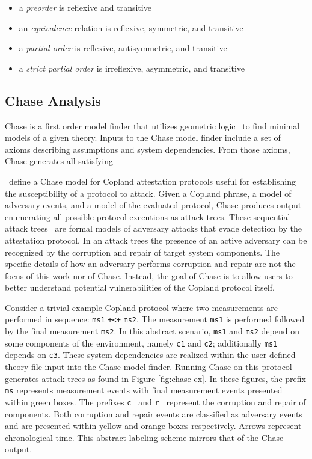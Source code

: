 \documentclass[runningheads]{llncs}
\theoremstyle{definition}
\newcommand{\squash}{\itemsep=0pt\parskip=0pt}
\begin{document}
\begin{itemize}
  \squash
\item a \emph{preorder} is reflexive and transitive
\item an \emph{equivalence} relation is reflexive, symmetric, and transitive 
\item a \emph{partial order} is reflexive, antisymmetric, and transitive 
\item a \emph{strict partial order} is irreflexive, asymmetric, and transitive 
\end{itemize}

\subsection*{Chase Analysis}

Chase \citep{Ramsdell:2020:Chase,Rowe:2021:AutomatedTrust} is a first
order model finder that utilizes geometric
logic~\citep{Enderton:logic} to find minimal models of a given
theory. Inputs to the Chase model finder include a set of axioms
describing assumptions and system dependencies. From those axioms,
Chase generates all satisfying


\citet{Rowe:2021:AutomatedTrust}~define a Chase model for Copland
attestation protocols useful for establishing the susceptibility of a
protocol to attack. Given a Copland phrase, a model of adversary
events, and a model of the evaluated protocol, Chase produces output
enumerating all possible protocol executions as attack trees. These
sequential attack trees~\citep{Horne:Attack, Jhaware:attack} are
formal models of adversary attacks that evade detection by the
attestation protocol.  In an attack trees the presence of an active
adversary can be recognized by the corruption and repair of target
system components. The specific details of how an adversary performs
corruption and repair are not the focus of this work nor of
Chase. Instead, the goal of Chase is to allow users to better
understand potential vulnerabilities of the Copland
protocol itself.

Consider a trivial example Copland protocol where two measurements are
performed in sequence: \texttt{ms1} \texttt{+<+} \texttt{ms2}.
The measurement \texttt{ms1} is performed followed by the
final measurement \texttt{ms2}. In this abstract scenario, \texttt{ms1} and
\texttt{ms2} depend on some components of the environment, namely
\texttt{c1} and \texttt{c2}; additionally \texttt{ms1} depends on
\texttt{c3}. These system dependencies are realized within the
user-defined theory file input into the Chase model finder. Running
Chase on this protocol generates attack trees as found in Figure
\ref{fig:chase-ex}. In these figures, the prefix \texttt{ms}
represents measurement events with final measurement events presented
within green boxes. The prefixes \texttt{c\_} and  \texttt{r\_} 
represent the corruption and repair of components. Both
corruption and repair events are classified as adversary events and
are presented within yellow and orange boxes respectively. Arrows 
represent chronological time. This abstract labeling scheme mirrors that of the Chase output.
\end{document}

